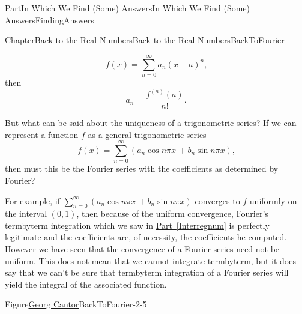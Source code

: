 \documentclass[oneside,10pt,]{book}
\newcommand{\xreffont}{\relax}
\numberwithin{equation}{part}
\begin{document}
\begin{partptx}{Part}{In Which We Find (Some) Answers}{}{In Which We Find (Some) Answers}{}{}{FindingAnswers}
\begin{chapterptx}{Chapter}{Back to the Real Numbers}{}{Back to the Real Numbers}{}{}{BackToFourier}
\begin{introduction}{}
\begin{equation*}
f(x)=\sum_{n=0}^\infty
a_n(x-a)^n \text{,}
\end{equation*}
then%
\begin{equation*}
a_n=\frac{f^{(n)}(a)}{n!}  \text{.}
\end{equation*}
%
\par
But what can be said about the uniqueness of a trigonometric series?  If we can represent a function \(f\) as a general trigonometric series%
\begin{equation*}
f(x)=\sum_{n=0}^\infty(a_n\cos n\pi
x\,+b_n\sin n\pi x) \text{,}
\end{equation*}
then must this be the Fourier series with the coefficients as determined by Fourier? %
\par
For example, if \(\sum_{n=0}^\infty(a_n\cos n\pi x\,+b_n\sin
n\pi x)\) converges to \(f\) uniformly on the interval \((0,1)\), then because of the uniform convergence, Fourier's term\textendash{}by\textendash{}term integration which we saw in \hyperref[Interregnum]{Part~{\xreffont\ref{Interregnum}}} is perfectly legitimate and the coefficients are, of necessity, the coefficients he computed. However we have seen that the convergence of a Fourier series need not be uniform.  This does not mean that we cannot integrate term\textendash{}by\textendash{}term, but it does say that we can't be sure that term\textendash{}by\textendash{}term integration of a Fourier series will yield the integral of the associated function.%
\begin{figureptx}{Figure}{\href{https://mathshistory.st-andrews.ac.uk/Biographies/Cantor/}{Georg Cantor}\protect\footnotemark{}}{BackToFourier-2-5}{}%
%
\begin{image}{0.325}{0.35}{0.325}{}%

\end{image}
\end{figureptx}
\end{introduction}
\end{chapterptx}
\end{partptx}
\end{document}

